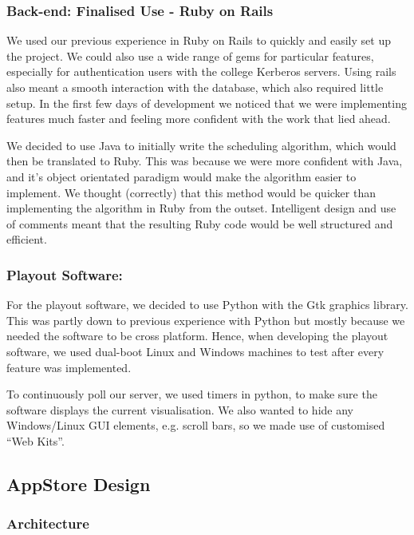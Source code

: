 \documentclass[a4paper, titlepage]{article}
\begin{document}
\subsubsection{Back-end: Finalised Use - Ruby on Rails} \label{sec:impl_RoR}

We used our previous experience in Ruby on Rails to quickly and easily set up the project. We could also
use a wide range of gems for particular features, especially for authentication users with the college
Kerberos servers. Using rails also meant a smooth interaction with the database, which also required 
little setup. In the first few days of development we noticed that we were implementing features much
faster and feeling more confident with the work that lied ahead. 

We decided to use Java to initially write the scheduling algorithm, which would then be translated to 
Ruby. This was because we were more confident with Java, and it's object orientated paradigm would make 
the algorithm easier to implement. We thought (correctly) that this method would be quicker than
implementing the algorithm in Ruby from the outset. Intelligent design and use of comments meant that
the resulting Ruby code would be well structured and efficient.
  

\subsubsection{Playout Software: }
For the playout software, we decided to use Python with the Gtk graphics library. This was partly down
to previous experience with Python but mostly because we needed the software to be cross platform. Hence,
when developing the playout software, we used dual-boot Linux and Windows machines to test after every 
feature was implemented. 

To continuously poll our server, we used timers in python, to make sure the software displays the 
current visualisation. We also wanted to hide any Windows/Linux GUI elements, e.g. scroll bars, so we 
made use of customised ``Web Kits''.


\subsection{AppStore Design}


\subsubsection{Architecture}
\end{document}
